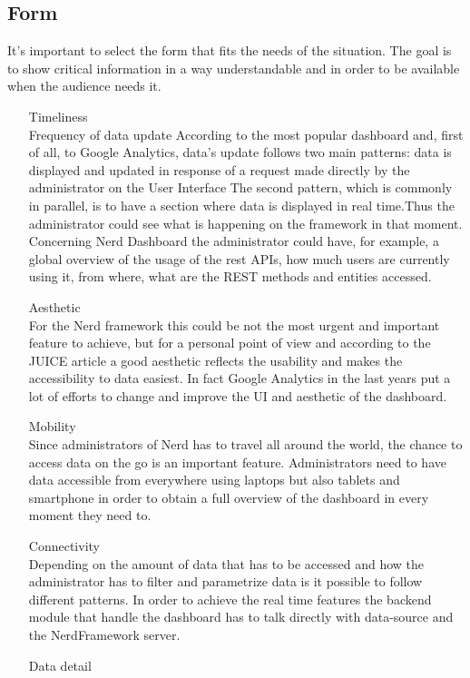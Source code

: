 \documentclass[a4paper,12pt]{report}
\begin{document}
\subsection{Form}
It's important to select the form that fits the needs of the situation.
The goal is to show critical information in a way understandable and in order to be available when the audience needs it.
\begin{itemize}
\item[Timeliness] \hfill \\
Frequency of  data update
According to the most popular dashboard and, first of all, to Google Analytics, data's update follows two main patterns: data  is displayed and updated in response of a request made directly by the administrator on the User Interface 
The second pattern, which is commonly in parallel, is to have a section where  data is displayed in real time.Thus the administrator could see what is happening on the framework in that moment. Concerning Nerd Dashboard the administrator could have, for example, a global overview of the usage of the rest APIs, how much users are currently using it, from where, what are the REST methods and entities accessed.
\item[Aesthetic] \hfill \\
For the Nerd framework this could be not the most urgent and important feature to achieve, but for a personal point of view and according to the JUICE article a good aesthetic reflects the usability and makes the accessibility to  data easiest.
In fact Google Analytics in the last years put a lot of efforts to change and improve the UI and aesthetic of the dashboard.
\item[Mobility] \hfill \\
Since administrators of Nerd has to travel all around the world, the chance to access data on the go is an important feature. Administrators need to have data accessible from everywhere using laptops but also tablets and smartphone in order to obtain a full overview of the dashboard in every moment they need to.
\item[Connectivity] \hfill \\
Depending on the amount of data that has to be accessed and how the administrator has to filter and parametrize data is it possible to follow different patterns. 
In order to achieve the real time features the backend module that handle the dashboard has to talk directly with data-source and the NerdFramework server.
\item[Data detail] \hfill \\

\end{itemize}
\end{document}
